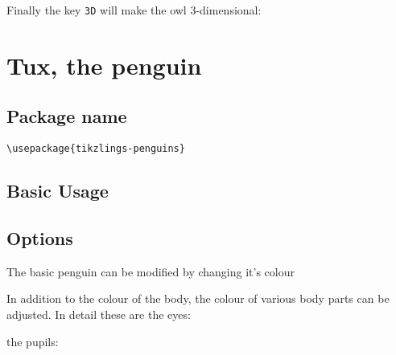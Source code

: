 \documentclass[parskip=half]{scrartcl}
\begin{document}
Finally the key \lstinline|3D| will make the owl 3-dimensional:

\begin{tcblisting}{}
\owl[3D]
\end{tcblisting}


\clearpage
\section[\textbackslash penguin]{Tux, the penguin}

\subsection{Package name}

\begin{tcolorbox}[lower separated=false, lefthand width=.8\linewidth]
\vspace*{0.5cm}
\lstinline|\usepackage{tikzlings-penguins}|
\vspace*{0.5cm}
\end{tcolorbox}

\subsection{Basic Usage}

\begin{tcblisting}{}
\penguin
\end{tcblisting}

\subsection{Options}

The basic penguin can be modified by changing it's colour

\begin{tcblisting}{}
\penguin[body=SteelBlue]
\end{tcblisting}

In addition to the colour of the body, the colour of various body parts can be adjusted. In detail these are the eyes:

\begin{tcblisting}{}
\penguin[eye=red]
\end{tcblisting}

the pupils:

\begin{tcblisting}{}
\penguin[pupil=red]
\end{tcblisting}
\end{document}
